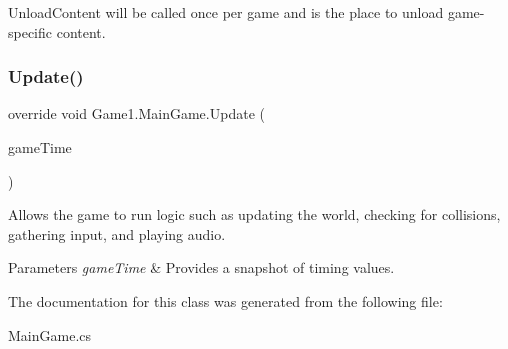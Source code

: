 Unload\+Content will be called once per game and is the place to unload game-\/specific content. 

\mbox{\label{class_game1_1_1_main_game_a2d1df0329baba8f95ffc70be1baf9ebc}} 
\subsubsection{\texorpdfstring{Update()}{Update()}}
{\footnotesize\ttfamily override void Game1.\+Main\+Game.\+Update (\begin{DoxyParamCaption}\item[{Game\+Time}]{game\+Time }\end{DoxyParamCaption})\hspace{0.3cm}{\ttfamily [protected]}}



Allows the game to run logic such as updating the world, checking for collisions, gathering input, and playing audio. 


\begin{DoxyParams}{Parameters}
{\em game\+Time} & Provides a snapshot of timing values.\\
\hline
\end{DoxyParams}


The documentation for this class was generated from the following file\+:\begin{DoxyCompactItemize}
\item 
Main\+Game.\+cs\end{DoxyCompactItemize}

